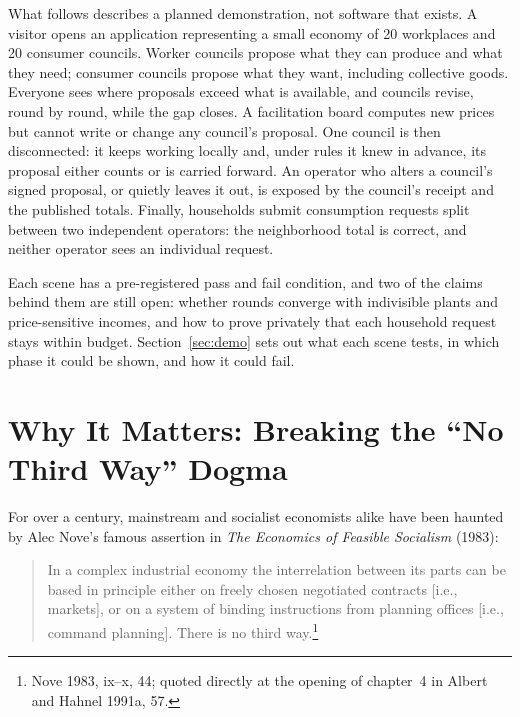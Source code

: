 \documentclass[10pt,twoside,openany]{book}
\theoremstyle{dpepstyle}
\begin{document}
What follows describes a planned demonstration, not software that exists. A visitor opens an application representing a small economy of 20 workplaces and 20 consumer councils. Worker councils propose what they can produce and what they need; consumer councils propose what they want, including collective goods. Everyone sees where proposals exceed what is available, and councils revise, round by round, while the gap closes. A facilitation board computes new prices but cannot write or change any council's proposal. One council is then disconnected: it keeps working locally and, under rules it knew in advance, its proposal either counts or is carried forward. An operator who alters a council's signed proposal, or quietly leaves it out, is exposed by the council's receipt and the published totals. Finally, households submit consumption requests split between two independent operators: the neighborhood total is correct, and neither operator sees an individual request.

Each scene has a pre-registered pass and fail condition, and two of the claims behind them are still open: whether rounds converge with indivisible plants and price-sensitive incomes, and how to prove privately that each household request stays within budget. Section~\ref{sec:demo} sets out what each scene tests, in which phase it could be shown, and how it could fail.

\section{\texorpdfstring{Why It Matters: Breaking the ``No Third Way'' Dogma}{Why It Matters: Breaking the “No Third Way” Dogma}}

For over a century, mainstream and socialist economists alike have been haunted by Alec Nove's famous assertion in \emph{The Economics of Feasible Socialism} (1983):
\begin{quote}
\small In a complex industrial economy the interrelation between its parts can be based in principle either on freely chosen negotiated contracts [i.e., markets], or on a system of binding instructions from planning offices [i.e., command planning]. There is no third way.\footnote{Nove 1983, ix--x, 44; quoted directly at the opening of chapter~4 in Albert and Hahnel 1991a, 57.}
\end{quote}
\end{document}
